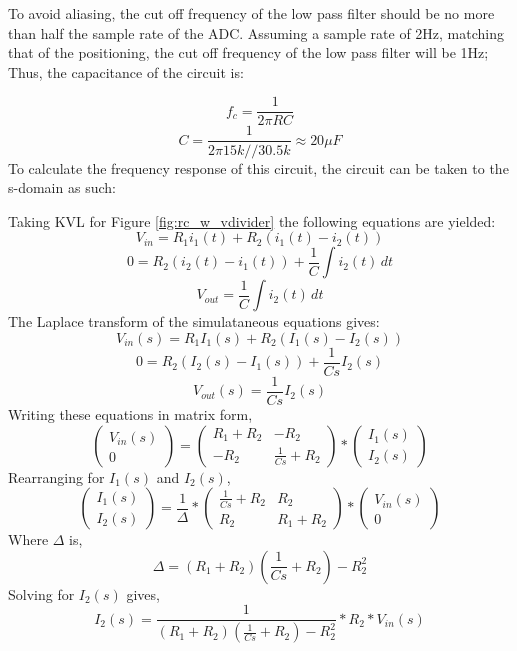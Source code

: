 \documentclass[12pt, a4paper]{article}
\begin{document}
To avoid aliasing, the cut off frequency of the low pass filter should be no more than half the sample rate of the ADC. 
Assuming a sample rate of 2Hz, matching that of the positioning, 
the cut off frequency of the low pass filter will be 1Hz; Thus, the capacitance of the circuit is:

\[f_c=\frac{1}{2{\pi}RC}\]
\[C=\frac{1}{2{\pi}15k//30.5k}  {\approx}  20{\mu}F \]
To calculate the frequency response of this circuit, the circuit can be taken to the s-domain as such:


Taking KVL for Figure \ref{fig:rc_w_vdivider} the following equations are yielded:
\[V_{in}=R_1i_1(t)+R_2(i_1(t)-i_2(t))\]
\[0=R_2(i_2(t)-i_1(t))+\frac{1}{C}\int i_2(t) \,dt\]
\[V_{out}=\frac{1}{C}\int i_2(t) \,dt\]
\indent The Laplace transform of the simulataneous equations gives:
\[V_{in}(s)=R_1I_1(s)+R_2(I_1(s)-I_2(s))\]
\[0=R_2(I_2(s)-I_1(s))+\frac{1}{Cs}I_2(s)\]
\[V_{out}(s)=\frac{1}{Cs}I_2(s)\]
\indent Writing these equations in matrix form,
$$
    \begin{pmatrix}
        V_{in}(s) \\
        0 
    \end{pmatrix} =
    \begin{pmatrix}
        R_1+R_2 & -R_2 \\
        -R_2 & \frac{1}{Cs}+R_2
    \end{pmatrix}
    *
    \begin{pmatrix}
        I_1(s) \\
        I_2(s)
    \end{pmatrix}
$$
\indent Rearranging for $I_1(s)$ and $I_2(s)$,
$$
    \begin{pmatrix}
        I_1(s) \\
        I_2(s)
    \end{pmatrix} =
    \frac{1}{\Delta} *
    \begin{pmatrix}
        \frac{1}{Cs}+R_2 & R_2 \\
        R_2 & R_1+R_2
    \end{pmatrix}
    *
    \begin{pmatrix}
        V_{in}(s) \\
        0 
    \end{pmatrix}
$$
\indent Where $\Delta$ is,
$$
    \Delta = (R_1+R_2)(\frac{1}{Cs}+R_2)-R_2^2
$$
\indent Solving for $I_2(s)$ gives,
\[I_2(s)=\frac{1}{(R_1+R_2)(\frac{1}{Cs}+R_2)-R_2^2}*R_2*V_{in}(s)\]                                                                                                                                                                                                                                                                                                                                                                                                                                                                                      
\end{document}
